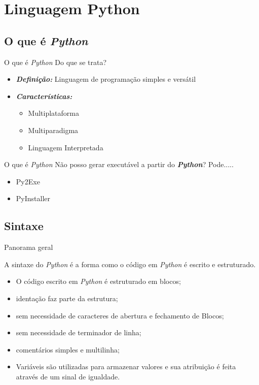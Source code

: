 \documentclass{beamer}
\begin{document}
\section{Linguagem Python}

\subsection{O que é \textit{Python}}


\begin{frame}{O que é \textit{Python}}
	Do que se trata?
	\begin{itemize}
		\item \textbf{\textit{Definição:}} Linguagem de programação simples e versátil
		\item \textbf{\textit{Características:}}
		\begin{itemize}
			\item Multiplataforma
			\item Multiparadigma
			\item Linguagem Interpretada
		\end{itemize}
	\end{itemize}
\end{frame}

\begin{frame}{O que é \textit{Python}}
	Não posso gerar executável a partir do \textbf{\textit{Python}}? Pode.....
	\begin{itemize}
		\item Py2Exe
		\item PyInstaller
	\end{itemize}
\end{frame}

\subsection{Sintaxe}

\begin{frame}{Panorama geral}
	
	A sintaxe do \textit{Python} é a forma como o código em \textit{Python} é escrito e
    estruturado. 
    
    \begin{itemize}
    	\item O código escrito em \textit{Python} é estruturado em blocos;
    	\item identação faz parte da estrutura;
    	\item sem necessidade de caracteres de abertura e fechamento de Blocos;
    	\item sem necessidade de terminador de linha;
    	\item comentários simples e multilinha;
    	\item Variáveis são utilizadas para armazenar valores e sua atribuição é feita através de um sinal de igualdade.
    \end{itemize}
	
\end{frame}
\end{document}
